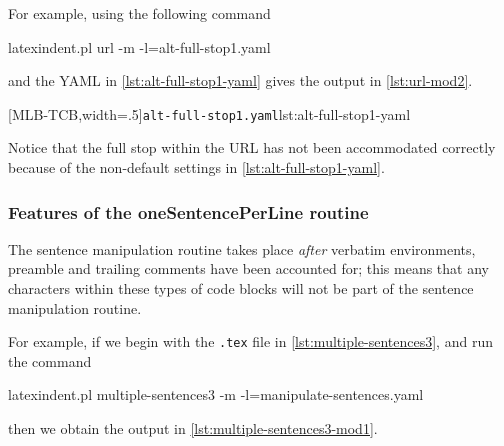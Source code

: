  \begin{example}
 For example, using the following command 

 \begin{commandshell}
latexindent.pl url -m -l=alt-full-stop1.yaml
\end{commandshell}

 and the YAML in \cref{lst:alt-full-stop1-yaml} gives the output in \cref{lst:url-mod2}.

 \begin{cmhtcbraster}[ raster left skip=-3.5cm,
   raster right skip=-2cm,
   raster force size=false,
   raster column 1/.style={add to width=.1\textwidth},
   raster column skip=.06\linewidth]
  [MLB-TCB,width=.5\textwidth]{\texttt{alt-full-stop1.yaml}}{lst:alt-full-stop1-yaml}
 \end{cmhtcbraster}

 Notice that the full stop within the URL has not been accommodated correctly because of
 the non-default settings in \cref{lst:alt-full-stop1-yaml}.
 \end{example}

\subsubsection{Features of the oneSentencePerLine routine}
 The sentence manipulation routine takes place \emph{after} verbatim  environments, preamble and trailing comments have been
 accounted for; this means that any characters within these types of code blocks will not
 be part of the sentence manipulation routine.

 \begin{example}
 For example, if we begin with the \texttt{.tex} file in \cref{lst:multiple-sentences3},
 and run the command  

 \begin{commandshell}
latexindent.pl multiple-sentences3 -m -l=manipulate-sentences.yaml
\end{commandshell}

 then we obtain the output in \cref{lst:multiple-sentences3-mod1}.
 \end{example}


